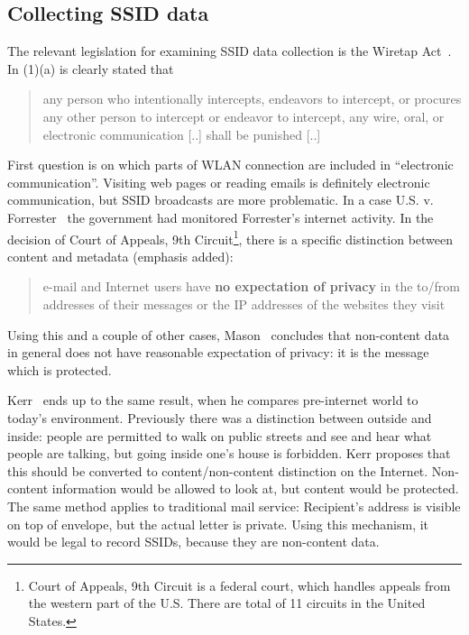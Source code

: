 \documentclass[12pt,a4paper,oneside,pdftex]{report}
\begin{document}
\subsection{Collecting SSID data}
\label{subsec:us_collecting}

The relevant legislation for examining SSID data collection is the Wiretap Act~\cite{wiretap_act}. In (1)(a) is clearly stated that

\begin{quote}
    any person who intentionally intercepts, endeavors to intercept, or procures any other person to intercept or endeavor to intercept, any wire, oral, or electronic communication [..] shall be punished [..]
\end{quote}

First question is on which parts of WLAN connection are included in ``electronic communication''. Visiting web pages or reading emails is definitely electronic communication, but SSID broadcasts are more problematic. In a case U.S. v. Forrester~\cite{us_forrester} the government had monitored Forrester's internet activity. In the decision of Court of Appeals, 9th Circuit\footnote{Court of Appeals, 9th Circuit is a federal court, which handles appeals from the western part of the U.S. There are total of 11 circuits in the United States.}, there is a specific distinction between content and metadata (emphasis added):

\begin{quote}
    e-mail and Internet users have \textbf{no expectation of privacy} in the to/from addresses of their messages or the IP addresses of the websites they visit
\end{quote}

Using this and a couple of other cases, Mason~\cite{mason2014aligning} concludes that non-content data in general does not have reasonable expectation of privacy: it is the message which is protected. 

Kerr~\cite{kerr2009applying} ends up to the same result, when he compares pre-internet world to today's environment. Previously there was a distinction between outside and inside: people are permitted to walk on public streets and see and hear what people are talking, but going inside one's house is forbidden. Kerr proposes that this should be converted to content/non-content distinction on the Internet. Non-content information would be allowed to look at, but content would be protected. The same method applies to traditional mail service: Recipient's address is visible on top of envelope, but the actual letter is private. Using this mechanism, it would be legal to record SSIDs, because they are non-content data.
\end{document}

